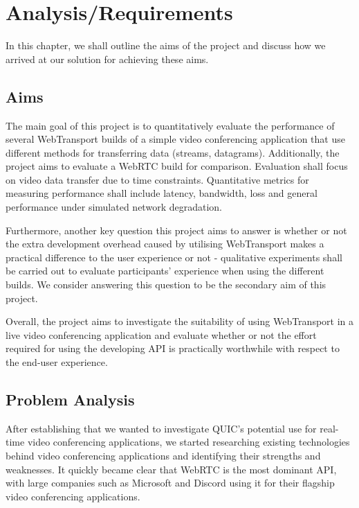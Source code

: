 
\chapter{Analysis/Requirements}
In this chapter, we shall outline the aims of the project and discuss how we arrived at our solution for achieving these aims. 

\section{Aims}

The main goal of this project is to quantitatively evaluate the performance of several WebTransport builds of a simple video conferencing application that use different methods for transferring data (streams, datagrams). Additionally, the project aims to evaluate a WebRTC build for comparison. Evaluation shall focus on video data transfer due to time constraints. Quantitative metrics for measuring performance shall include latency, bandwidth, loss and general performance under simulated network degradation. 

Furthermore, another key question this project aims to answer is whether or not the extra development overhead caused by utilising WebTransport makes a practical difference to the user experience or not - qualitative experiments shall be carried out to evaluate participants’ experience when using the different builds. We consider answering this question to be the secondary aim of this project.

Overall, the project aims to investigate the suitability of using WebTransport in a live video conferencing application and evaluate whether or not the effort required for using the developing API is practically worthwhile with respect to the end-user experience.

\section{Problem Analysis}

After establishing that we wanted to investigate QUIC's potential use for real-time video conferencing applications, we started researching existing technologies behind video conferencing applications and identifying their strengths and weaknesses. It quickly became clear that WebRTC is the most dominant API, with large companies such as Microsoft and Discord using it for their flagship video conferencing applications. 

